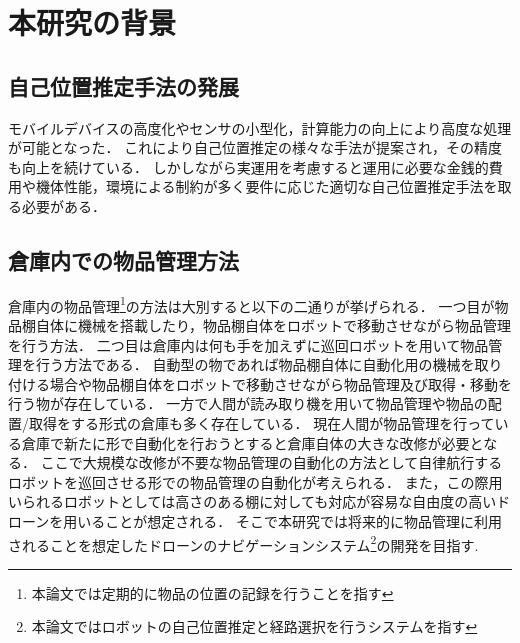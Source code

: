 \section{本研究の背景}
\label{background}
\subsection{自己位置推定手法の発展}
モバイルデバイスの高度化やセンサの小型化，計算能力の向上により高度な処理が可能となった．
これにより自己位置推定の様々な手法が提案され，その精度も向上を続けている．
しかしながら実運用を考慮すると運用に必要な金銭的費用や機体性能，環境による制約が多く要件に応じた適切な自己位置推定手法を取る必要がある．

\subsection{倉庫内での物品管理方法}
倉庫内の物品管理\footnote{本論文では定期的に物品の位置の記録を行うことを指す}の方法は大別すると以下の二通りが挙げられる．
一つ目が物品棚自体に機械を搭載したり，物品棚自体をロボットで移動させながら物品管理を行う方法．
二つ目は倉庫内は何も手を加えずに巡回ロボットを用いて物品管理を行う方法である．
自動型の物であれば物品棚自体に自動化用の機械を取り付ける場合や物品棚自体をロボットで移動させながら物品管理及び取得・移動を行う物が存在している．
一方で人間が読み取り機を用いて物品管理や物品の配置/取得をする形式の倉庫も多く存在している．
現在人間が物品管理を行っている倉庫で新たに形で自動化を行おうとすると倉庫自体の大きな改修が必要となる．
ここで大規模な改修が不要な物品管理の自動化の方法として自律航行するロボットを巡回させる形での物品管理の自動化が考えられる．
また，この際用いられるロボットとしては高さのある棚に対しても対応が容易な自由度の高いドローンを用いることが想定される．
そこで本研究では将来的に物品管理に利用されることを想定したドローンのナビゲーションシステム\footnote{本論文ではロボットの自己位置推定と経路選択を行うシステムを指す}の開発を目指す.

